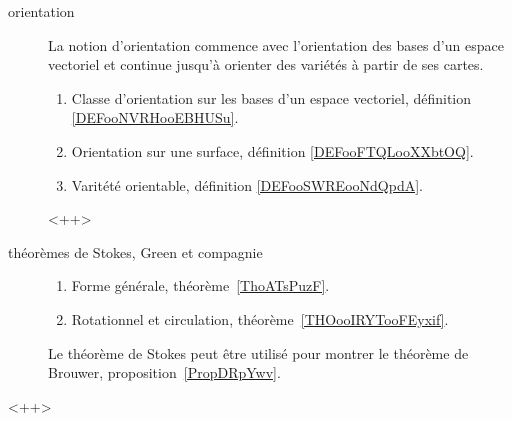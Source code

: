\begin{description}
    \item[orientation]
        La notion d'orientation commence avec l'orientation des bases d'un espace vectoriel et continue jusqu'à orienter des variétés à partir de ses cartes.
        \begin{enumerate}
            \item
                Classe d'orientation sur les bases d'un espace vectoriel, définition \ref{DEFooNVRHooEBHUSu}.
            \item
                Orientation sur une surface, définition \ref{DEFooFTQLooXXbtOQ}.
            \item
                Varitété orientable, définition \ref{DEFooSWREooNdQpdA}.
        \end{enumerate}
        <++>
    \item[théorèmes de Stokes, Green et compagnie] 
    \begin{enumerate}
        \item
            Forme générale, théorème~\ref{ThoATsPuzF}.
        \item
            Rotationnel et circulation, théorème~\ref{THOooIRYTooFEyxif}.
        \end{enumerate}
        Le théorème de Stokes peut être utilisé pour montrer le théorème de Brouwer, proposition~\ref{PropDRpYwv}.
\end{description}
<++>


